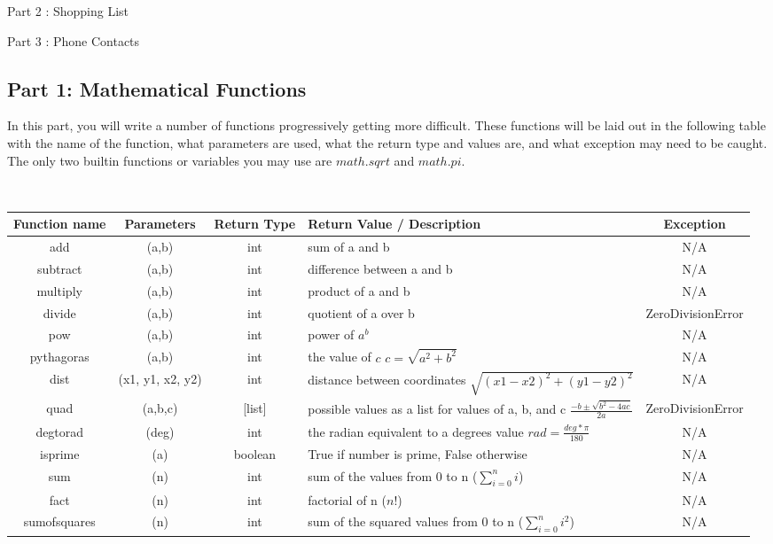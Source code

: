 \documentclass[12pt]{report}
\newcommand\tab[1][1cm]{\hspace*{#1}}
\begin{document}
\tab Part 2 : Shopping List

\tab Part 3 : Phone Contacts




\newpage

\subsection*{Part 1: Mathematical Functions}

In this part, you will write a number of functions progressively getting more difficult.
These functions will be laid out in the following table with the name of the function, what parameters are used, what the return type and values are, and what exception may need to be caught. 
The only two builtin functions or variables you may use are ${math.sqrt}$ and ${math.pi}$. 

${}$

\begin{tabular}{| c | c | c | M | c |}
    \hline
    Function name & Parameters & Return Type & Return Value / Description & Exception\\
    \hline
    add & (a,b) & int & sum of a and b & N/A \\
    \hline
    subtract & (a,b) & int & difference between a and b & N/A \\
    \hline
    multiply & (a,b) & int & product of a and b & N/A \\
    \hline
    divide & (a,b) & int & quotient of a over b & ZeroDivisionError \\
    \hline
    pow & (a,b) & int & power of ${a^b}$ & N/A \\
    \hline
    pythagoras & (a,b) & int & the value of ${c}$ \newline ${c = \sqrt{a^2 + b^2}}$ & N/A \\
    \hline
    dist & (x1, y1, x2, y2) & int & distance between coordinates \newline $\sqrt{(x1 - x2)^2 + (y1 - y2)^2}$ & N/A \\
    \hline
    quad & (a,b,c) & [list] & possible values as a list for values of a, b, and c \newline $\frac{-b\pm\sqrt{b^2-4ac}}{2a}$& ZeroDivisionError \\
    \hline
    degtorad & (deg) & int & the radian equivalent to a degrees value \newline ${rad = \frac{deg * \pi}{180}}$ & N/A\\
    \hline
    isprime & (a) & boolean & True if number is prime, False otherwise & N/A \\
    \hline
    sum & (n) & int & sum of the values from 0 to n \newline (${\sum_{i = 0}^{n}{i}}$) & N/A \\
    \hline
    fact & (n) & int & factorial of n (${n!}$) & N/A \\
    \hline
    sumofsquares & (n) & int & sum of the squared values from 0 to n \newline (${\sum_{i = 0}^{n}{i^2}}$) & N/A\\
    \hline
\end{tabular}
\end{document}
